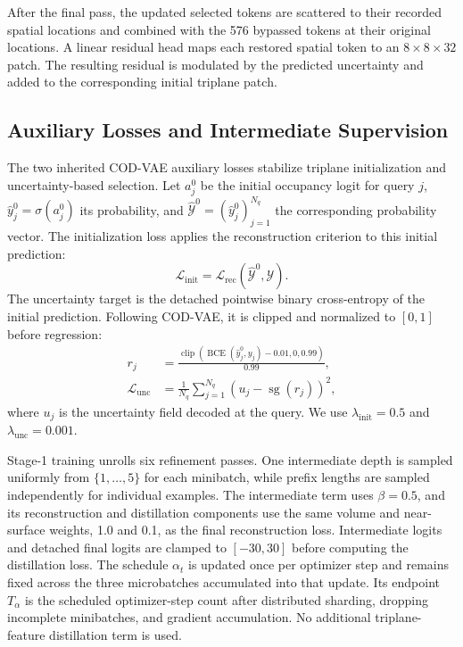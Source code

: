 After the final pass, the updated selected tokens are scattered to their
recorded spatial locations and combined with the 576 bypassed tokens at their
original locations. A linear residual head maps each restored spatial token to an
$8\times8\times32$ patch. The resulting residual is modulated by the predicted
uncertainty and added to the corresponding initial triplane patch.

\subsection{Auxiliary Losses and Intermediate Supervision}
\label{sec:training-supervision}

The two inherited COD-VAE auxiliary losses stabilize triplane initialization
and uncertainty-based selection. Let $a_j^0$ be the initial occupancy logit for
query $j$, $\hat y_j^0=\sigma(a_j^0)$ its probability, and
$\hat{\mathcal{Y}}^0=(\hat y_j^0)_{j=1}^{N_q}$ the corresponding probability
vector. The initialization loss applies the reconstruction criterion to this
initial prediction:
\begin{equation}
\mathcal{L}_{\mathrm{init}}
=\mathcal{L}_{\mathrm{rec}}(\hat{\mathcal{Y}}^0,\mathcal{Y}).
\end{equation}
The uncertainty target is the detached pointwise binary cross-entropy of the
initial prediction.  Following COD-VAE, it is clipped and normalized to
$[0,1]$ before regression:
\begin{align}
r_j & =
\frac{\operatorname{clip}(\operatorname{BCE}(\hat y_j^0,y_j)-0.01,0,0.99)}{0.99},\\
\mathcal{L}_{\mathrm{unc}}
&=\frac{1}{N_q}\sum_{j=1}^{N_q}(u_j-\operatorname{sg}(r_j))^2,
\end{align}
where $u_j$ is the uncertainty field decoded at the query. We use
$\lambda_{\mathrm{init}}=0.5$ and $\lambda_{\mathrm{unc}}=0.001$.

Stage-1 training unrolls six refinement passes. One intermediate depth is
sampled uniformly from $\{1,\ldots,5\}$ for each minibatch, while prefix
lengths are sampled independently for individual examples. The intermediate
term uses $\beta=0.5$, and its reconstruction and distillation components use
the same volume and near-surface weights, 1.0 and 0.1, as the final
reconstruction loss. Intermediate logits and detached final logits are
clamped to $[-30,30]$ before computing the distillation loss. The schedule
$\alpha_t$ is updated once per optimizer step and remains fixed across the
three microbatches accumulated into that update. Its endpoint $T_\alpha$ is
the scheduled optimizer-step count after distributed sharding, dropping
incomplete minibatches, and gradient accumulation. No additional
triplane-feature distillation term is used.

